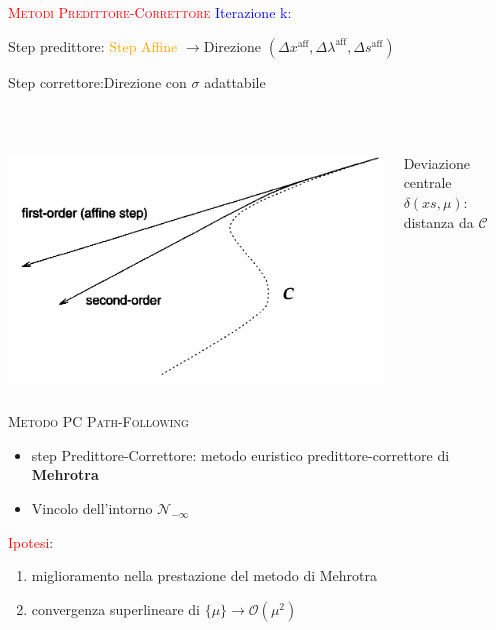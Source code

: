 \begin{frame}{\textsc{\LARGE \textcolor{red}{Metodi Predittore-Correttore}}}
\pause
\textcolor{blue}{Iterazione k:}
\pause
{}
\setcounter{elenco}{0}
\begin{list}{}{\setlength{\itemsep}{0.6cm}}
	\item Step predittore: \textcolor{orange}{Step Affine} $\rightarrow$\pause Direzione $(\Delta x^{\text{aff}}, \Delta \lambda^{\text{aff}},\Delta s^{\text{aff}})$
	\pause
	\item Step correttore:\pause \;\;Direzione con $\sigma$ adattabile
	\end{list}
\\[1 cm]
\pause
\begin{columns}
	\begin{column}{0.4\textwidth}
	\includegraphics[width=\columnwidth]{MEH.PNG}
\end{column}
\begin{column}{0.4\textwidth}
	Deviazione centrale $\delta(xs, \mu)$: distanza da $\mathcal{C}$
\end{column}
\end{columns}

\end{frame}


\begin{frame}[t]{\textsc{\LARGE \textcolor{sapphire}{Metodo PC Path-Following}}}
\begin{itemize}
\item step Predittore-Correttore: metodo euristico predittore-correttore di \textbf{Mehrotra}
\item Vincolo dell'intorno $\mathcal{N}_{-\infty}$
\end{itemize}
\pause
\textcolor{red}{Ipotesi}: 
\begin{enumerate}
	\item miglioramento nella prestazione del metodo di Mehrotra
	\item convergenza superlineare di $\{\mu\}\rightarrow \mathcal{O}(\mu^{2})$
\end{enumerate}
\end{frame}

